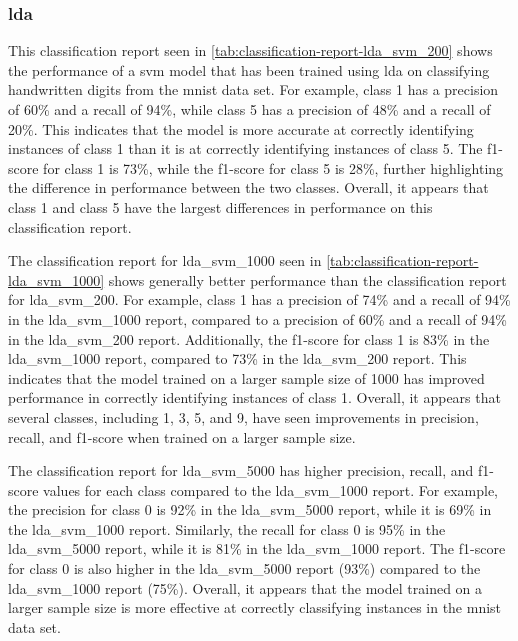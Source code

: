 \subsubsection{\gls{lda}}\label{subsubsec:experiment_4_lda}




This classification report seen in \ref{tab:classification-report-lda_svm_200} shows the performance of a \gls{svm} model that has been trained using \gls{lda} on classifying handwritten digits from the \gls{mnist} data set. For example, class 1 has a precision of 60\% and a recall of 94\%, while class 5 has a precision of 48\% and a recall of 20\%. This indicates that the model is more accurate at correctly identifying instances of class 1 than it is at correctly identifying instances of class 5. The f1-score for class 1 is 73\%, while the f1-score for class 5 is 28\%, further highlighting the difference in performance between the two classes. Overall, it appears that class 1 and class 5 have the largest differences in performance on this classification report.



The classification report for lda\_svm\_1000 seen in \ref{tab:classification-report-lda_svm_1000} shows generally better performance than the classification report for lda\_svm\_200. For example, class 1 has a precision of 74\% and a recall of 94\% in the lda\_svm\_1000 report, compared to a precision of 60\% and a recall of 94\% in the lda\_svm\_200 report. Additionally, the f1-score for class 1 is 83\% in the lda\_svm\_1000 report, compared to 73\% in the lda\_svm\_200 report. This indicates that the model trained on a larger sample size of 1000 has improved performance in correctly identifying instances of class 1. Overall, it appears that several classes, including 1, 3, 5, and 9, have seen improvements in precision, recall, and f1-score when trained on a larger sample size.




The classification report for lda\_svm\_5000 has higher precision, recall, and f1-score values for each class compared to the lda\_svm\_1000 report. For example, the precision for class 0 is 92\% in the lda\_svm\_5000 report, while it is 69\% in the lda\_svm\_1000 report. Similarly, the recall for class 0 is 95\% in the lda\_svm\_5000 report, while it is 81\% in the lda\_svm\_1000 report. The f1-score for class 0 is also higher in the lda\_svm\_5000 report (93\%) compared to the lda\_svm\_1000 report (75\%). Overall, it appears that the model trained on a larger sample size is more effective at correctly classifying instances in the \gls{mnist} data set.

